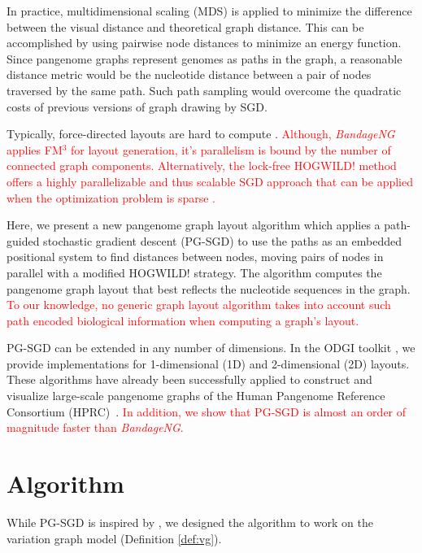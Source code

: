 \documentclass{bioinfo}
\theoremstyle{definition}
\newcommand{\red}[1]{{\textcolor{Red}{#1}}}
\begin{document}
	In practice, multidimensional scaling (MDS) is applied to minimize the difference between the visual distance and theoretical graph distance.
	This can be accomplished by using pairwise node distances to minimize an energy function.
	Since pangenome graphs represent genomes as paths in the graph, a reasonable distance metric would be the nucleotide distance between a pair of nodes traversed by the same path. Such path sampling would overcome the quadratic costs of previous versions of graph drawing by SGD.
	
	Typically, force-directed layouts are hard to compute \citep{wang_research_2014}. \red{Although, \textit{BandageNG} applies FM$^{3}$ for layout generation, it's parallelism is bound by the number of connected graph components. Alternatively, the lock-free HOGWILD! method offers a highly parallelizable and thus scalable SGD approach that can be applied when the optimization problem is sparse \citep{Recht2011}.}	
	
	Here, we present a new pangenome graph layout algorithm which applies a path-guided stochastic gradient descent (PG-SGD) to use the paths as an embedded positional system to find distances between nodes, moving pairs of nodes in parallel with a modified HOGWILD! strategy.
	The algorithm computes the pangenome graph layout that best reflects the nucleotide sequences in the graph.
	\red{To our knowledge, no generic graph layout algorithm takes into account such path encoded biological information when computing a graph's layout.}
	
	PG-SGD can be extended in any number of dimensions.
	In the ODGI toolkit \citep{Guarracino2022}, we provide implementations for 1-dimensional (1D) and 2-dimensional (2D) layouts.
	These algorithms have already been successfully applied to construct and visualize large-scale pangenome graphs of the Human Pangenome Reference Consortium (HPRC)~\citep{Liao2023, Guarracino2023}.
	\red{In addition, we show that PG-SGD is almost an order of magnitude faster than \textit{BandageNG}.}

	\section{Algorithm}

	While PG-SGD is inspired by \cite{Zheng2019}, we designed the algorithm to work on the variation graph model (Definition \ref{def:vg}).
	
\end{document}

